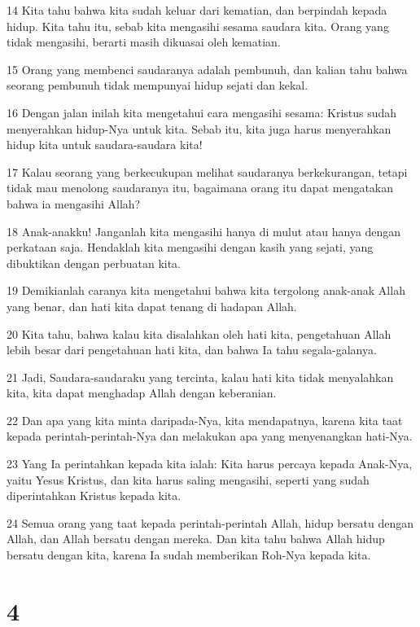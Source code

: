 \par 14 Kita tahu bahwa kita sudah keluar dari kematian, dan berpindah kepada hidup. Kita tahu itu, sebab kita mengasihi sesama saudara kita. Orang yang tidak mengasihi, berarti masih dikuasai oleh kematian.
\par 15 Orang yang membenci saudaranya adalah pembunuh, dan kalian tahu bahwa seorang pembunuh tidak mempunyai hidup sejati dan kekal.
\par 16 Dengan jalan inilah kita mengetahui cara mengasihi sesama: Kristus sudah menyerahkan hidup-Nya untuk kita. Sebab itu, kita juga harus menyerahkan hidup kita untuk saudara-saudara kita!
\par 17 Kalau seorang yang berkecukupan melihat saudaranya berkekurangan, tetapi tidak mau menolong saudaranya itu, bagaimana orang itu dapat mengatakan bahwa ia mengasihi Allah?
\par 18 Anak-anakku! Janganlah kita mengasihi hanya di mulut atau hanya dengan perkataan saja. Hendaklah kita mengasihi dengan kasih yang sejati, yang dibuktikan dengan perbuatan kita.
\par 19 Demikianlah caranya kita mengetahui bahwa kita tergolong anak-anak Allah yang benar, dan hati kita dapat tenang di hadapan Allah.
\par 20 Kita tahu, bahwa kalau kita disalahkan oleh hati kita, pengetahuan Allah lebih besar dari pengetahuan hati kita, dan bahwa Ia tahu segala-galanya.
\par 21 Jadi, Saudara-saudaraku yang tercinta, kalau hati kita tidak menyalahkan kita, kita dapat menghadap Allah dengan keberanian.
\par 22 Dan apa yang kita minta daripada-Nya, kita mendapatnya, karena kita taat kepada perintah-perintah-Nya dan melakukan apa yang menyenangkan hati-Nya.
\par 23 Yang Ia perintahkan kepada kita ialah: Kita harus percaya kepada Anak-Nya, yaitu Yesus Kristus, dan kita harus saling mengasihi, seperti yang sudah diperintahkan Kristus kepada kita.
\par 24 Semua orang yang taat kepada perintah-perintah Allah, hidup bersatu dengan Allah, dan Allah bersatu dengan mereka. Dan kita tahu bahwa Allah hidup bersatu dengan kita, karena Ia sudah memberikan Roh-Nya kepada kita.

\chapter{4}

